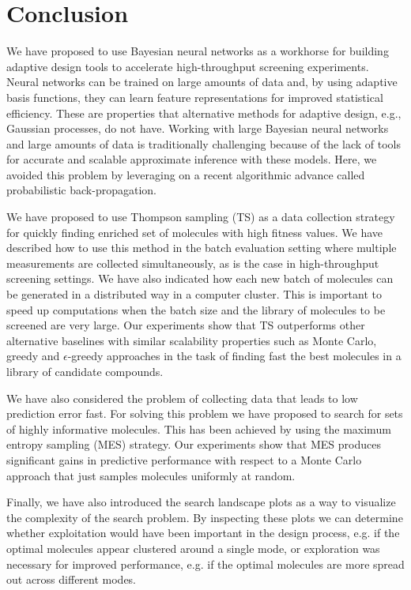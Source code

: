 \section{Conclusion}

We have proposed to use Bayesian neural networks as a workhorse for building adaptive design tools to accelerate high-throughput screening experiments. Neural networks can be trained on large amounts of data and, by using adaptive basis functions, they can learn feature representations for improved statistical efficiency. These are properties that alternative methods for adaptive design, e.g., Gaussian processes, do not have. Working with large Bayesian neural networks and large amounts of data is traditionally challenging because of the lack of tools for accurate and scalable approximate inference with these models. Here, we avoided this problem by leveraging on a recent algorithmic advance called probabilistic back-propagation.

We have proposed to use Thompson sampling (TS) as a data collection strategy for quickly finding enriched set of molecules with high fitness values. We have described how to use this method in the batch evaluation setting where multiple measurements are collected simultaneously, as is the case in high-throughput screening settings. We have also indicated how each new batch of molecules can be generated in a distributed way in a computer cluster. This is important to speed up computations when the batch size and the library of molecules to be screened are very large. Our experiments show that TS outperforms other alternative baselines with similar scalability properties such as Monte Carlo, greedy and $\epsilon$-greedy approaches in the task of finding fast the best molecules in a library of candidate compounds.

We have also considered the problem of collecting data that leads to low prediction error fast. For solving this problem we have proposed to search for sets of highly informative molecules. This has been achieved by using the maximum entropy sampling (MES) strategy. Our experiments show that MES produces significant gains in predictive performance with respect to a Monte Carlo approach that just samples molecules uniformly at random.

Finally, we have also introduced the search landscape plots as a way to visualize the complexity of the search problem. By inspecting these plots we can determine whether exploitation would have been important in the design process, e.g. if the optimal molecules appear clustered around a single mode, or exploration was necessary for improved performance, e.g. if the optimal molecules are more spread out across different modes.